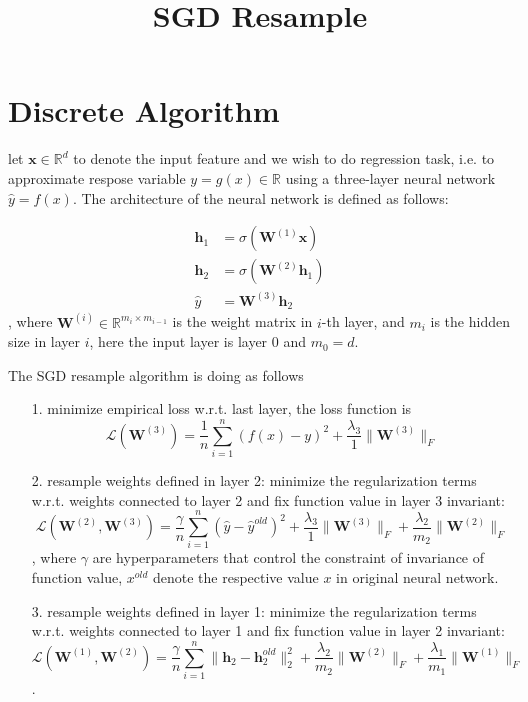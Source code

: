 \documentclass{article}
\title{SGD Resample}
\newcommand{\Lc}{{\mathcal{L}}}
\newcommand{\vx}{{\mathbf{x}}}
\newcommand{\vh}{{\mathbf{h}}}
\newcommand{\vW}{{\mathbf{W}}}
\newcommand{\Rb}{{\mathbb{R}}}
\begin{document}
%

\maketitle

\section{Discrete Algorithm}

let $\vx \in \Rb^d$ to denote the input feature and we wish to do regression task, i.e. to approximate respose variable $y=g(x) \in \Rb$ using a three-layer neural network $\hat{y}=f(x)$. The architecture of the neural network is defined as follows:

\begin{equation}
\begin{aligned}
    \vh_1 &= \sigma(\vW^{(1)} \vx) \\
    \vh_2 &= \sigma(\vW^{(2)} \vh_1) \\
    \hat{y} &= \vW^{(3)} \vh_2
\end{aligned}
\end{equation}, where $\vW^{(i)} \in \Rb^{m_i\times m_{i-1}}$ is the weight matrix in $i$-th layer, and $m_i$ is the hidden size in layer $i$, here the input layer is layer $0$ and $m_0 = d$.

The SGD resample algorithm is doing as follows

\begin{itemize}
    \item[1.] minimize empirical loss w.r.t. last layer, the loss function is
    $$\Lc(\vW^{(3)}) = \frac{1}{n}\sum_{i=1}^n (f(x)-y)^2 + \frac{\lambda_3}{1} \|\vW^{(3)}\|_F$$
    \item[2.] resample weights defined in layer 2: minimize the regularization terms w.r.t. weights connected to layer 2 and fix function value in layer 3 invariant:
    $$\Lc(\vW^{(2)}, \vW^{(3)}) = \frac{\gamma}{n}\sum_{i=1}^n (\hat{y}-\hat{y}^{old})^2 + \frac{\lambda_3}{1} \|\vW^{(3)}\|_F + \frac{\lambda_2}{m_2} \|\vW^{(2)}\|_F$$, where $\gamma$ are hyperparameters that control the constraint of invariance of function value, $x^{old}$ denote the respective value $x$ in original neural network.
    \item[3.] resample weights defined in layer 1: minimize the regularization terms w.r.t. weights connected to layer 1 and fix function value in layer 2 invariant:
    $$\Lc(\vW^{(1)}, \vW^{(2)}) = \frac{\gamma}{n}\sum_{i=1}^n \|\vh_2-\vh_2^{old}\|_2^2 + \frac{\lambda_2}{m_2} \|\vW^{(2)}\|_F + \frac{\lambda_1}{m_1} \|\vW^{(1)}\|_F$$.
\end{itemize}
\end{document}
